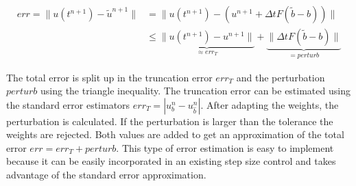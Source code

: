 \documentclass[a4paper]{article}
\numberwithin{equation}{section}
\theoremstyle{plain}
\theoremstyle{definition}
\numberwithin{theorem}{section}
\newcommand{\dt}{{\Delta t}}
\newcommand{\1}{\mathbbm{1}}
\begin{document}
\begin{align}
err = \|u(t^{n+1})-\tilde u^{n+1}\| &= \|u(t^{n+1}) - (u^{n+1}+\dt F(\tilde{b}-b))\| \\
 &\leq \underbrace{\|u(t^{n+1})-u^{n+1}\|}_{\approx err_T}+\underbrace{\|\dt F(\tilde{b}-b)\|}_{= perturb} \label{eq:Err}
\end{align}

The total error is split up in the truncation error $err_T$ and the perturbation $perturb$ using the triangle inequality. 
The truncation error can be estimated using the standard error estimators $err_T = | u^{n}_{b} - u^{n}_{\hat{b}} |$. 
After adapting the weights, the perturbation is calculated. If the perturbation is larger than the tolerance the weights are rejected.
Both values are added to get an approximation of the total error $err = err_T + perturb$.
This type of error estimation is easy to implement because it can be easily incorporated in an existing step size control and takes advantage of the standard error approximation.

\end{document}
